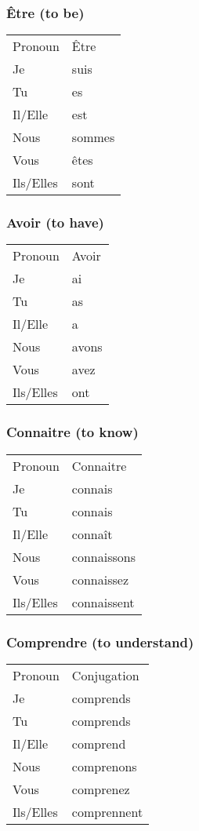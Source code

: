 \subsubsection{\^Etre (to be)}
\begin{tabular}{| l | l |}
\hline
Pronoun 	& 	\^Etre	\\
Je		&	suis	\\
Tu		&	es	\\
Il/Elle		&	est	\\
Nous		&	sommes	\\
Vous		&	\^etes	\\
Ils/Elles	&	sont	\\
\hline
\end{tabular}

\subsubsection{Avoir (to have)}
\begin{tabular}{| l | l |}
\hline
Pronoun 	& 	Avoir	\\
Je		&	ai	\\
Tu		&	as	\\
Il/Elle		&	a	\\
Nous		&	avons	\\
Vous		&	avez	\\
Ils/Elles	&	ont	\\
\hline
\end{tabular}

\subsubsection{Connaitre (to know)}
\begin{tabular}{| l | l |}
\hline
Pronoun 	& 	Connaitre	\\
Je		    &	connais		\\
Tu		    &	connais		\\
Il/Elle     &	conna\^it	\\
Nous		&	connaissons	\\
Vous		&	connaissez	\\
Ils/Elles	&	connaissent	\\
\hline
\end{tabular}

\subsubsection{Comprendre (to understand)}
\begin{tabular}{| l | l |}
\hline
Pronoun 	& 	Conjugation	\\
Je		&	comprends	\\
Tu		&	comprends	\\
Il/Elle		&	comprend	\\
Nous		&	comprenons	\\
Vous		&	comprenez	\\
Ils/Elles	&	comprennent	\\
\hline
\end{tabular}

